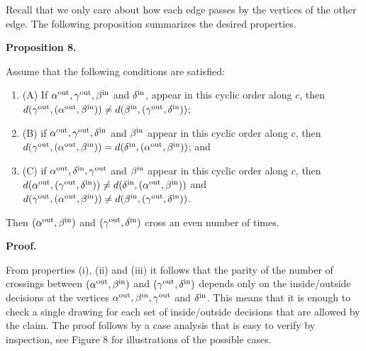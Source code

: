 \par
\par
Recall that we only care about how each edge passes by the vertices of the other edge. The following proposition summarizes the desired properties.
\par
\par
\par\medskip\noindent\textbf{Proposition 8.}\par
Assume that the following conditions are satisfied:
\par
\begin{enumerate}
\item[]  (A) 
If $\alpha^{\rm out},\gamma^{\rm out},\beta^{\rm in}$ and $\delta^{\rm in}$, appear in this cyclic order along $c$, then $d(\gamma^{\rm out},(\alpha^{\rm out},\beta^{\rm in}))\neq d(\beta^{\rm in},(%
\gamma^{\rm out},\delta^{\rm in}))$;
\par
\par
\item[]  (B) 
if $\alpha^{\rm out},\gamma^{\rm out},\delta^{\rm in}$ and $\beta^{\rm in}$ appear in this cyclic order along $c$, then $d(\gamma^{\rm out},(\alpha^{\rm out},\beta^{\rm in}))=d(\delta^{\rm in},(%
\alpha^{\rm out},\beta^{\rm in}))$; and
\par
\par
\item[]  (C) 
if $\alpha^{\rm out},\delta^{\rm in},\gamma^{\rm out}$ and $\beta^{\rm in}$ appear in this cyclic order along $c$, then $d(\alpha^{\rm out},(\gamma^{\rm out},\delta^{\rm in}))\neq d(\delta^{\rm in},(%
\alpha^{\rm out},\beta^{\rm in}))$ and $d(\gamma^{\rm out},(\alpha^{\rm out},\beta^{\rm in}))\neq d(\beta^{\rm in},(%
\gamma^{\rm out},\delta^{\rm in}))$.
\par
\par
\end{enumerate}
Then $(\alpha^{\rm out},\beta^{\rm in})$ and $(\gamma^{\rm out},\delta^{\rm in})$ cross an even number of times.
\par
\par
\par
\par\medskip\noindent\textbf{Proof.}\par
From properties (i), (ii) and (iii) it follows that the parity of the number of crossings between $(\alpha^{\rm out},\beta^{\rm in})$ and $(\gamma^{\rm out},\delta^{\rm in})$ depends only on the inside/outside decisions at the vertices $\alpha^{\rm out},\beta^{\rm in},\gamma^{\rm out}$ and $\delta^{\rm in}$. This means that it is enough to check a single drawing for each set of inside/outside decisions that are allowed by the claim. The proof follows by a case analysis that is easy to verify by inspection, see Figure 8 for illustrations of the possible cases.
